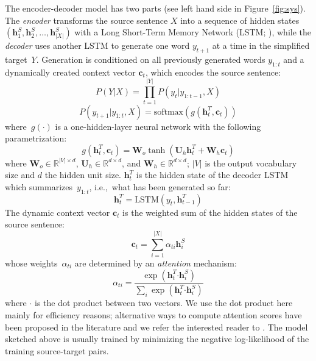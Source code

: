 \documentclass[11pt,letterpaper]{article}
\begin{document}
The encoder-decoder model has two parts (see left hand side in
Figure~\ref{fig:sys}). The \emph{encoder} transforms the source
sentence $X$ into a sequence of hidden states
$(\mathbf{h}^S_1, \mathbf{h}^S_2, \dots, \mathbf{h}^S_{|X|})$ with a
Long Short-Term Memory Network (LSTM; \citealt{hochreiter1997long}),
while the \emph{decoder} uses another LSTM to generate one word
$y_{t+1}$ at a time in the simplified target~$Y$.
Generation is conditioned on all previously generated words
$y_{1:t}$ and a dynamically created context vector $\mathbf{c}_t$,
which encodes the source sentence:
\begin{equation}
\label{eq:sent_prob}
P(Y | X) = \prod_{t=1}^{|Y|} P(y_t|y_{1:t-1},X)
\end{equation}
\begin{equation}
\label{eq:policy}
P(y_{t+1}|y_{1:t}, X) = \text{softmax}( g( \mathbf{h}^T_t, \mathbf{c}_t ) )
\end{equation}
where~$g(\cdot)$ is a one-hidden-layer neural network with the
following parametrization:
\begin{equation}
g( \mathbf{h}^T_t, \mathbf{c}_t ) = \mathbf{W}_o \tanh (\mathbf{U}_h \mathbf{h}^T_t + \mathbf{W}_h \mathbf{c}_t )
\end{equation}
where $\mathbf{W}_o \in \mathbb{R}^{|V| \times d}$, $\mathbf{U}_h \in
\mathbb{R}^{d \times d}$, and $\mathbf{W}_h \in \mathbb{R}^{d \times
	d}$; $|V|$ is the output vocabulary size and $d$ the hidden unit
size.  $\mathbf{h}^T_t$ is the hidden state of the decoder LSTM which
summarizes~$y_{1:t}$, i.e.,~what has been generated so far:
\begin{equation}
\mathbf{h}^T_t = \text{LSTM}(y_t, \mathbf{h}^T_{t-1})
\end{equation}
The dynamic context vector $\mathbf{c}_t$ is the weighted sum of the
hidden states of the source sentence:
\begin{equation}
\mathbf{c}_t = \sum_{i=1}^{|X|} \alpha_{ti} \mathbf{h}^S_i
\end{equation}
whose weights~$\alpha_{ti}$ are determined by an \emph{attention}
mechanism:
\begin{equation}
\label{eq:attention}
\alpha_{ti} = \frac{\exp( \mathbf{h}^T_t \boldsymbol{\cdot}  \mathbf{h}^S_i )}{\sum_i \exp( \mathbf{h}^T_t \boldsymbol{\cdot}  \mathbf{h}^S_i )}
\end{equation}
where $\boldsymbol{\cdot}$ is the dot product between two vectors. We
use the dot product here mainly for efficiency reasons; alternative
ways to compute attention scores have been proposed in the literature
and we refer the interested reader to
. The model sketched above is usually
trained by minimizing the negative log-likelihood of the training
source-target pairs.
\end{document}
